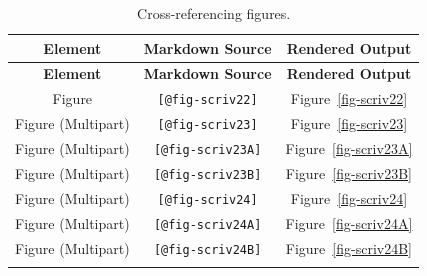 \documentclass[
  12pt,
  a4paper,
  oneside,
  numbers=noenddot,
  titlepage,
  toclink=all,
  toc=bibliography]{scrbook}
\theoremstyle{definition}
\theoremstyle{definition}
\theoremstyle{definition}
\theoremstyle{plain}
\theoremstyle{plain}
\theoremstyle{plain}
\theoremstyle{plain}
\theoremstyle{plain}
\theoremstyle{remark}
\begin{document}
\hypertarget{tbl-scriv21}{}
\begin{longtable}[]{@{}ccc@{}}
\toprule\noalign{}
\textbf{Element} & \textbf{Markdown Source} & \textbf{Rendered
Output} \\
\midrule\noalign{}
\endfirsthead
\toprule\noalign{}
\textbf{Element} & \textbf{Markdown Source} & \textbf{Rendered
Output} \\
\midrule\noalign{}
\endhead
\bottomrule\noalign{}
\endlastfoot
Figure & \texttt{{[}@fig-scriv22{]}} &
\protect\hypertarget{cite_75}{}{\label{cite_75}Figure~\ref{fig-scriv22}} \\
Figure (Multipart) & \texttt{{[}@fig-scriv23{]}} &
\protect\hypertarget{cite_76}{}{\label{cite_76}Figure~\ref{fig-scriv23}} \\
Figure (Multipart) & \texttt{{[}@fig-scriv23A{]}} &
\protect\hypertarget{cite_77}{}{\label{cite_77}Figure~\ref{fig-scriv23A}} \\
Figure (Multipart) & \texttt{{[}@fig-scriv23B{]}} &
\protect\hypertarget{cite_78}{}{\label{cite_78}Figure~\ref{fig-scriv23B}} \\
Figure (Multipart) & \texttt{{[}@fig-scriv24{]}} &
\protect\hypertarget{cite_79}{}{\label{cite_79}Figure~\ref{fig-scriv24}} \\
Figure (Multipart) & \texttt{{[}@fig-scriv24A{]}} &
\protect\hypertarget{cite_80}{}{\label{cite_80}Figure~\ref{fig-scriv24A}} \\
Figure (Multipart) & \texttt{{[}@fig-scriv24B{]}} &
\protect\hypertarget{cite_81}{}{\label{cite_81}Figure~\ref{fig-scriv24B}} \\
\caption{\label{tbl-scriv21}Cross-referencing figures.}\tabularnewline
\end{longtable}
\end{document}
